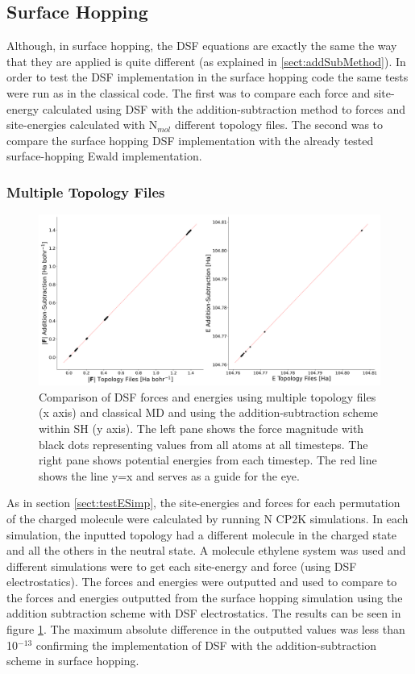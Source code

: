 \subsection{Surface Hopping}
Although, in surface hopping, the DSF equations are exactly the same the way that they are applied is quite different (as explained in \ref{sect:addSubMethod}). In order to test the DSF implementation in the surface hopping code the same  tests were run as in the classical code. The first was to compare each force and site-energy calculated using DSF with the addition-subtraction method to forces and site-energies calculated with N$_{mol}$ different topology files. The second was to compare the surface hopping DSF implementation with the already tested surface-hopping Ewald implementation.

\subsubsection{Multiple Topology Files}
\begin{figure}[ht]
  \includegraphics[width=\textwidth]{../img/ES/DSF_SH_test_topologies.png}
	\caption{\label{fig:FSSH_DSF_top}Comparison of DSF forces and energies using multiple topology files (x axis) and classical MD and using the addition-subtraction scheme within SH (y axis). The left pane shows the force magnitude with black dots representing values from all atoms at all timesteps. The right pane shows potential energies from each timestep. The red line shows the line y=x and serves as a guide for the eye.}
\end{figure}
\noindent As in section \ref{sect:testESimp}, the site-energies and forces for each permutation of the charged molecule were calculated by running N CP2K simulations. In each simulation, the inputted topology had a different molecule in the charged state and all the others in the neutral state. A  molecule ethylene system was used and  different simulations were  to get each site-energy and force (using DSF electrostatics). The forces and energies were outputted and used to compare to the forces and energies outputted from the surface hopping simulation using the addition subtraction scheme with DSF electrostatics. The results can be seen in figure \ref{fig:FSSH_DSF_top}. The maximum absolute difference in the outputted values was less than 10$^{-13}$ confirming the implementation of DSF with the addition-subtraction scheme in surface hopping.
